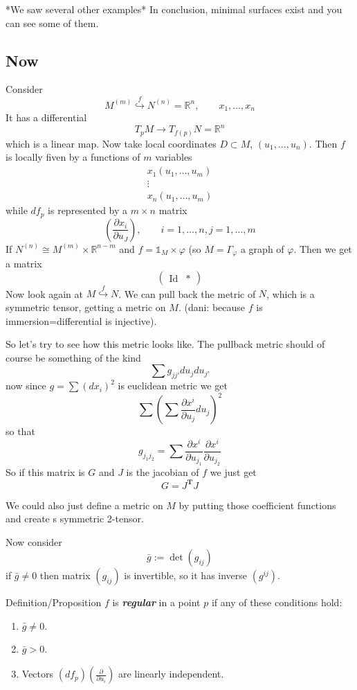 *We saw several other examples* In conclusion, minimal surfaces exist and you can see some of them.

\subsection{Now}

Consider
\[M^{(m)}\overset{f}{\hookrightarrow }N^{(n)}=\mathbb{R}^n,\qquad x_1,\ldots,x_n\]
It has a differential
\[T_pM \longrightarrow T_{f(p)}N=\mathbb{R}^n\]
which is a linear map. Now take local coordinates \(D \subset M\), \((u_1,\ldots,u_n)\). Then \(f \) is locally fiven by a functions of \(m\) variables
\begin{align*}
	x_1(u_1,\ldots,u_m)\\
	\vdots \\
	x_n(u_1,\ldots,u_m)
\end{align*}
while \(df_p\) is represented by a \(m\times n\) matrix
\[\left(\frac{\partial x_i}{\partial u_J}\right) ,\qquad  i=1,\ldots,n, j=1,\ldots,m\]
If \(N^{(n)}\cong M^{(m)}\times \mathbb{R}^{n-m}\) and \(f= \mathbb{1}_M \times \varphi\) (so \(M = \Gamma_\varphi\) a graph of \(\varphi\). Then we get a matrix
\[\begin{pmatrix} \operatorname{Id} & * \end{pmatrix} \]
Now look again at \(M \overset{f}{\hookrightarrow }N\). We can pull back the metric of \(N\), which is a symmetric tensor, getting a metric on \(M\). ({\color{6}dani: because \(f\) is immersion=differential is injective).}

So let's try to see how this metric looks like. The pullback metric should of course be something of the kind
\[\sum g_{j j'} du_j du_{j'}\]
now since \(g= \sum (dx_i)^2\) is euclidean metric we get
\[\sum \left(\sum \frac{\partial x^i}{\partial u_j}du_j\right)^2 \]
so that
\[g_{j_1j_2}= \sum \frac{\partial x^i}{\partial u_{j_1}}\frac{\partial x^i}{\partial u_{j_2}}\]
So if this matrix is \(G\) and \(J\) is the jacobian of \(f\) we just get
\[G=J^{\mathbf{T}}J\]

\begin{remark}\leavevmode
We could also just define a metric on \(M\) by putting those coefficient functions and create s symmetric 2-tensor.
\end{remark}
Now consider
\[\bar{g} :=\det(g_{ij})\]
if \(\bar{g}\neq 0 \) then matrix  \((g_{ij})\) is invertible, so it has inverse \((g^{ij})\).

\begin{thing8}{Definition/Proposition}\leavevmode
\(f\) is \textit{\textbf{regular}} in a point \(p\) if any of these conditions hold:
\begin{enumerate}
\item \(\bar{g}\neq 0\).
\item \(\bar{g}>0\).
\item Vectors \(\left(df_p\right) \left(\frac{\partial }{\partial u_i}\right) \) are linearly independent.
\end{enumerate}
\end{thing8}

